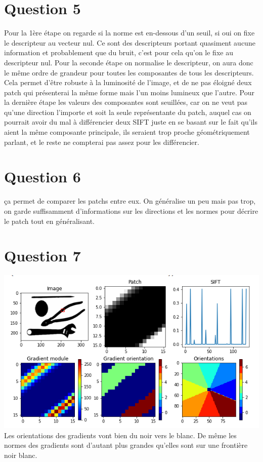 \documentclass[11pt]{article}
\begin{document}
\section*{\large Question 5}
Pour la 1ère étape on regarde si la norme est en-dessous d'un seuil, si oui on fixe le descripteur au vecteur nul. Ce sont des descripteurs portant quasiment aucune information et probablement que du bruit, c'est pour cela qu'on le fixe au descripteur nul.
\hfill \break 
Pour la seconde étape on normalise le descripteur, on aura donc le même ordre de grandeur pour toutes les composantes de tous les descripteurs. Cela permet d’être robuste à la luminosité de l'image, et de ne pas éloigné deux patch qui présenterai la même forme mais l'un moins lumineux que l'autre.
\hfill \break 
Pour la dernière étape les valeurs des composantes sont seuillées, car on ne veut pas qu'une direction l'importe et soit la seule représentante du patch, auquel cas on pourrait avoir du mal à différencier deux SIFT juste en se basant sur le fait qu'ils aient la même composante principale, ils seraient trop proche géométriquement parlant, et le reste ne compterai pas assez pour les différencier.


\section*{\large Question 6}
ça permet de comparer les patchs entre eux. On généralise un peu mais pas trop, on garde suffisamment d'informations sur les directions et les normes pour décrire le patch tout en généralisant.

\section*{\large Question 7}

\includegraphics{q7}
Les orientations des gradients vont bien du noir vers le blanc. De même les normes des gradients sont d'autant plus grandes qu'elles sont sur une frontière noir blanc. 
\end{document}
